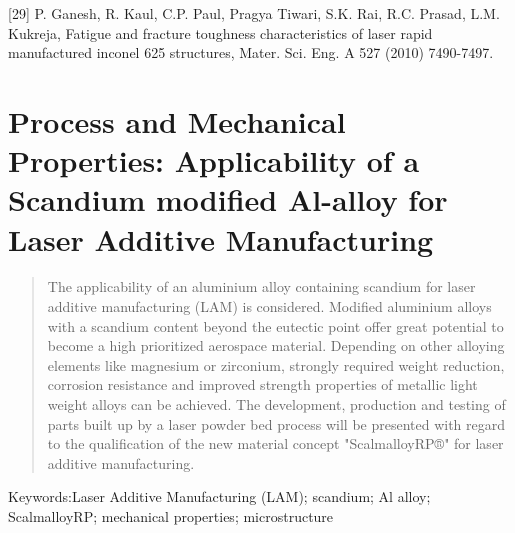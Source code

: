 \documentclass[10pt]{article}
\begin{document}
[29] P. Ganesh, R. Kaul, C.P. Paul, Pragya Tiwari, S.K. Rai, R.C. Prasad, L.M. Kukreja, Fatigue and fracture toughness characteristics of laser rapid manufactured inconel 625 structures, Mater. Sci. Eng. A 527 (2010) 7490-7497.

\section*{Process and Mechanical Properties: Applicability of a Scandium modified Al-alloy for Laser Additive Manufacturing }


\begin{abstract}
The applicability of an aluminium alloy containing scandium for laser additive manufacturing (LAM) is considered. Modified aluminium alloys with a scandium content beyond the eutectic point offer great potential to become a high prioritized aerospace material. Depending on other alloying elements like magnesium or zirconium, strongly required weight reduction, corrosion resistance and improved strength properties of metallic light weight alloys can be achieved. The development, production and testing of parts built up by a laser powder bed process will be presented with regard to the qualification of the new material concept "ScalmalloyRP®" for laser additive manufacturing.
\end{abstract}

Keywords:Laser Additive Manufacturing (LAM); scandium; Al alloy; ScalmalloyRP; mechanical properties; microstructure
\end{document}
